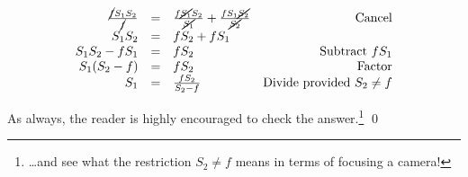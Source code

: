 \documentclass{ximera}
\begin{document}
\begin{example}
\begin{explanation}
\begin{enumerate}
\[\begin{array}{rclr}
\frac{\cancel{f}S_1S_2}{\cancel{f}} & = & \frac{f\cancel{S_1}S_2}{\cancel{S_1}} + \frac{fS_1\cancel{S_2}}{\cancel{S_2}} & \text{Cancel} \\  

S_1S_2 & = & f S_2 + fS_1 & \\  

S_1S_2  - fS_1 & = & f S_2   &  \text{Subtract $fS_1$} \\  

S_1(S_2 - f) & = & f S_2 & \text{Factor}  \\  

S_1 & = & \frac{f S_2}{S_2 - f} & \text{Divide provided  $S_2 \neq f$}  \\

\end{array}\]

As always, the reader is highly encouraged to check the answer.\footnote{\ldots and see what the restriction $S_2 \neq f$ means in terms of focusing a camera!}  \qed

\end{enumerate}
\end{explanation}
\end{example}



\closegraphsfile
\end{document}
